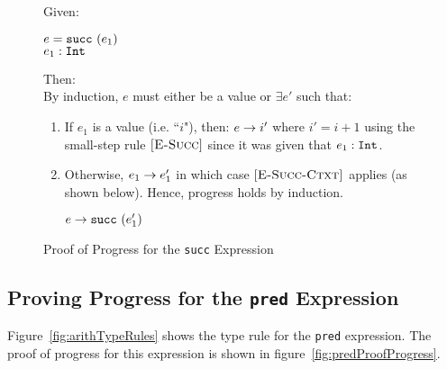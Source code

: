 \documentclass{report}
\newcommand{\rel}[1]{\mbox{\sc [#1]}}
\begin{document}
\begin{figure}[ht!]
Given:
\begin{center}
  $e = \mbox{\tt succ}~(e_1)$ \\
   ${e_1} : {\mbox{\tt Int}}$
\end{center}
Then:~\\

By induction, $e$ must either be a value or $\exists e'$ such that:~\\

	\begin{enumerate}
    \item If $e_1$ is a value (i.e. ``$i$"), then: ${e} \rightarrow {i'}$ where $i' = i + 1$ using the small-step rule $\rel{E-Succ}$ since it was given that ${e_1} : {\mbox{\tt Int}}$.
      
    \item Otherwise, ${e_1} \rightarrow {e'_1}$ in which case $\rel{E-Succ-Ctxt}$ applies (as shown below). Hence, progress holds by induction.
    
    \begin{center}
      ${e} \rightarrow {\mbox{\tt succ}~(e'_1)}$
    \end{center}
	
	\end{enumerate}
	
  \caption{Proof of Progress for the \texttt{succ} Expression}\label{fig:succProofProgress}
\end{figure}


\subsection{Proving Progress for the \texttt{pred} Expression}

Figure~\ref{fig:arithTypeRules} shows the type rule for the \texttt{pred} expression.  The proof of progress for this expression is shown in figure~\ref{fig:predProofProgress}.
\end{document}
